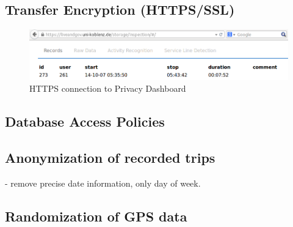 \subsection{Transfer Encryption (HTTPS/SSL)}
\begin{figure}
\includegraphics[width=\textwidth]{screenshots/HTTPS.png}
\caption{HTTPS connection to Privacy Dashboard}
\end{figure}

\subsection{Database Access Policies}

\subsection{Anonymization of recorded trips}
- remove precise date information, only day of week.

\subsection{Randomization of GPS data}
